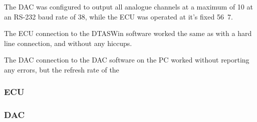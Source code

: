 The DAC was configured to output all analogue channels at a maximum of \unit{10}{\hertz} at an RS-232 baud rate of \unit{38}{\kilo\bit\per\second}, while the ECU was operated at it's fixed \unit{56.7}{\kilo\bit\per\second}.

The ECU connection to the DTASWin software worked the same as with a hard line connection, and without any hiccups.

The DAC connection to the DAC software on the PC worked without reporting any errors, but the refresh rate of the 

\subsubsection{ECU}

\subsubsection{DAC}
